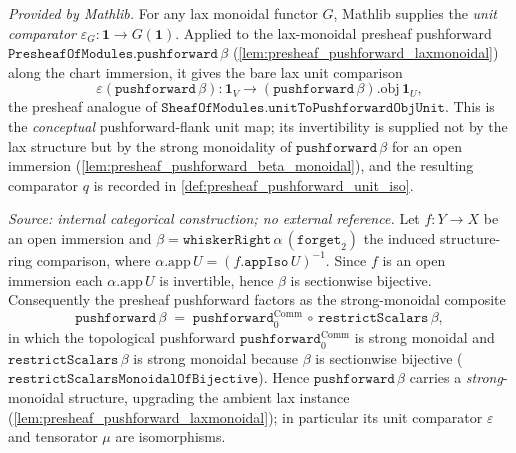 \begin{definition}
  \label{def:presheaf_pushforward_unit_eps}
  \mathlibok
  \textit{Provided by Mathlib.}
  For any lax monoidal functor \(G\), Mathlib supplies the \emph{unit comparator}
  \(\varepsilon_G : \mathbf 1 \to G(\mathbf 1)\). Applied to the lax-monoidal presheaf pushforward
  \(\mathtt{PresheafOfModules.pushforward}\,\beta\) (\cref{lem:presheaf_pushforward_laxmonoidal}) along
  the chart immersion, it gives the bare lax unit comparison
  \[
    \varepsilon(\mathtt{pushforward}\,\beta) :
      \mathbf 1_V \longrightarrow (\mathtt{pushforward}\,\beta).\mathrm{obj}\,\mathbf 1_U ,
  \]
  the presheaf analogue of \(\mathtt{SheafOfModules.unitToPushforwardObjUnit}\). This is the
  \emph{conceptual} pushforward-flank unit map; its invertibility is supplied not by the lax
  structure but by the strong monoidality of \(\mathtt{pushforward}\,\beta\) for an open immersion
  (\cref{lem:presheaf_pushforward_beta_monoidal}), and the resulting comparator \(q\) is recorded in
  \cref{def:presheaf_pushforward_unit_iso}.
\end{definition}

\begin{lemma}

  \label{lem:presheaf_pushforward_beta_monoidal}
  \textit{Source: internal categorical construction; no external reference.}
  Let \(f : Y \to X\) be an open immersion and \(\beta = \mathtt{whiskerRight}\,\alpha\,
  (\mathtt{forget}_2)\) the induced structure-ring comparison, where
  \(\alpha.\mathrm{app}\,U = (f.\mathtt{appIso}\,U)^{-1}\). Since \(f\) is an open immersion each
  \(\alpha.\mathrm{app}\,U\) is invertible, hence \(\beta\) is sectionwise bijective. Consequently the
  presheaf pushforward factors as the strong-monoidal composite
  \[
    \mathtt{pushforward}\,\beta \;=\;
      \mathtt{pushforward}_0^{\mathrm{Comm}} \,\circ\, \mathtt{restrictScalars}\,\beta ,
  \]
  in which the topological pushforward \(\mathtt{pushforward}_0^{\mathrm{Comm}}\) is strong monoidal
  and \(\mathtt{restrictScalars}\,\beta\) is strong monoidal because \(\beta\) is sectionwise
  bijective (\(\mathtt{restrictScalarsMonoidalOfBijective}\)). Hence \(\mathtt{pushforward}\,\beta\)
  carries a \emph{strong}-monoidal structure, upgrading the ambient lax instance
  (\cref{lem:presheaf_pushforward_laxmonoidal}); in particular its unit comparator
  \(\varepsilon\) and tensorator \(\mu\) are isomorphisms.
\end{lemma}

